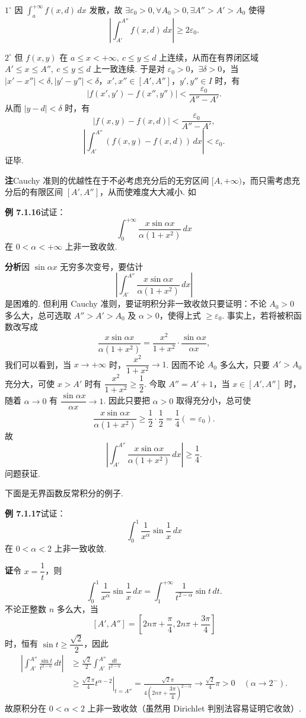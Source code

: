 \documentclass[UTF8,12pt,a4paper,fontset=fandol]{ctexart}
\begin{document}
$1^\circ$ 因 $\displaystyle\int_a^{+\infty}f(x,d)\,dx$ 发散，故 $\exists\varepsilon_0>0,\forall A_0>0,\exists A''>A'>A_0$ 使得
\[
\left|\int_{A'}^{A''}f(x,d)\,dx\right|\ge2\varepsilon_0.
\]

$2^\circ$ 但 $f(x,y)$ 在 $a\le x<+\infty,\ c\le y\le d$ 上连续，从而在有界闭区域 $A'\le x\le A'',\ c\le y\le d$ 上一致连续. 于是对 $\varepsilon_0>0$，$\exists\delta>0$，当 $|x'-x''|<\delta, |y'-y''|<\delta$，$x',x''\in[A',A'']$，$y',y''\in I$ 时，有
\[
|f(x',y')-f(x'',y'')|<\frac{\varepsilon_0}{A''-A'}.
\]
从而 $|y-d|<\delta$ 时，有
\[
|f(x,y)-f(x,d)|<\frac{\varepsilon_0}{A''-A'},
\]
\[
\left|\int_{A'}^{A''}(f(x,y)-f(x,d))\,dx\right|<\varepsilon_0.
\]
证毕.

\noindent\textbf{注}\quad Cauchy 准则的优越性在于不必考虑充分后的无穷区间 $[A,+\infty)$，而只需考虑充分后的有限区间 $[A',A'']$，从而使难度大大减小. 如

\noindent\textbf{例 7.1.16}\quad 试证：
\[
\int_0^{+\infty}\frac{x\sin\alpha x}{\alpha(1+x^2)}\,dx
\]
在 $0<\alpha<+\infty$ 上非一致收敛.

\noindent\textbf{分析}\quad 因 $\sin\alpha x$ 无穷多次变号，要估计
\[
\left|\int_{A'}^{A''}\frac{x\sin\alpha x}{\alpha(1+x^2)}\,dx\right|
\]
是困难的. 但利用 Cauchy 准则，要证明积分非一致收敛只要证明：不论 $A_0>0$ 多么大，总可选取 $A''>A'>A_0$ 及 $\alpha>0$，使得上式 $\ge\varepsilon_0$. 事实上，若将被积函数改写成
\[
\frac{x\sin\alpha x}{\alpha(1+x^2)}
=\frac{x^2}{1+x^2}\cdot\frac{\sin\alpha x}{\alpha x},
\]
我们可以看到，当 $x\to+\infty$ 时，$\dfrac{x^2}{1+x^2}\to1$. 因而不论 $A_0$ 多么大，只要 $A'>A_0$ 充分大，可使 $x>A'$ 时有 $\dfrac{x^2}{1+x^2}\ge\dfrac12$. 今取 $A''=A'+1$，当 $x\in[A',A'']$ 时，随着 $\alpha\to0$ 有 $\dfrac{\sin\alpha x}{\alpha x}\to1$. 因此只要把 $\alpha>0$ 取得充分小，总可使
\[
\frac{x\sin\alpha x}{\alpha(1+x^2)}
\ge\frac12\cdot\frac12=\frac14(=\varepsilon_0).
\]
故
\[
\left|\int_{A'}^{A''}\frac{x\sin\alpha x}{\alpha(1+x^2)}\,dx\right|\ge\frac14.
\]
问题获证.

下面是无界函数反常积分的例子.

\noindent\textbf{例 7.1.17}\quad 试证：
\[
\int_0^1\frac1{x^\alpha}\sin\frac1x\,dx
\]
在 $0<\alpha<2$ 上非一致收敛.

\noindent\textbf{证}\quad 令 $x=\dfrac1t$，则
\[
\int_0^1\frac1{x^\alpha}\sin\frac1x\,dx
=\int_1^{+\infty}\frac1{t^{2-\alpha}}\sin t\,dt.
\]
不论正整数 $n$ 多么大，当
\[
[A',A'']=\left[2n\pi+\frac\pi4,2n\pi+\frac{3\pi}4\right]
\]
时，恒有 $\sin t\ge\dfrac{\sqrt2}{2}$，因此
\[
\begin{aligned}
\left|\int_{A'}^{A''}\frac{\sin t}{t^{2-\alpha}}\,dt\right|
&\ge\frac{\sqrt2}{2}\int_{A'}^{A''}\frac{dt}{t^{2-\alpha}}\\
&\ge\left.\frac{\sqrt2\pi}{4}t^{\alpha-2}\right|_{t=A''}
=\frac{\sqrt2\pi}{4\left(2n\pi+\dfrac{3\pi}{4}\right)^{2-\alpha}}
\to\frac{\sqrt2}{4}\pi>0
\quad(\alpha\to2^-).
\end{aligned}
\]
故原积分在 $0<\alpha<2$ 上非一致收敛（虽然用 Dirichlet 判别法容易证明它收敛）.
\end{document}
